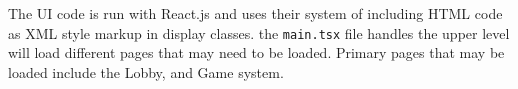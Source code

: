 \documentclass[12pt]{report}
\begin{document}
The UI code is run with React.js and uses their system of including HTML code as XML style markup in display classes. the \texttt{main.tsx} file handles the upper level will load different pages that may need to be loaded. Primary pages that may be loaded include the Lobby, and Game system. 





\end{document}
